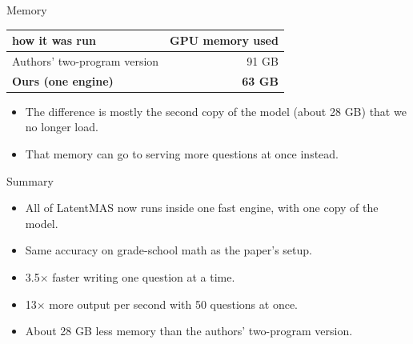 \documentclass[aspectratio=169]{beamer}
\begin{document}
\begin{frame}{Memory}

\begin{center}
\begin{tabular}{lr}
\toprule
how it was run & GPU memory used \\
\midrule
Authors' two-program version & 91 GB \\
\textbf{Ours (one engine)} & \textbf{63 GB} \\
\bottomrule
\end{tabular}
\end{center}

\begin{itemize}
  \item The difference is mostly the second copy of the model (about 28 GB) that we no longer load.
  \item That memory can go to serving more questions at once instead.
\end{itemize}

\end{frame}

\begin{frame}{Summary}

\begin{itemize}
  \item All of LatentMAS now runs inside one fast engine, with one copy of the model.
  \item Same accuracy on grade-school math as the paper's setup.
  \item 3.5$\times$ faster writing one question at a time.
  \item 13$\times$ more output per second with 50 questions at once.
  \item About 28 GB less memory than the authors' two-program version.
\end{itemize}

\end{frame}
\end{document}
